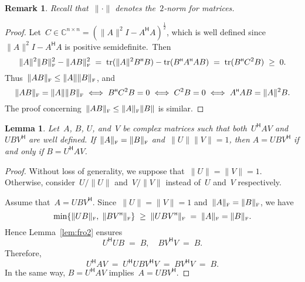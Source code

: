 \documentclass[11pt,a4paper]{article}  %
\numberwithin{equation}{section}
\newtheorem{lemma}{Lemma}%
\newtheorem{remark}{Remark}%
\theoremstyle{definition}
\def\CC{\mathbb{C}}
\DeclareMathOperator{\tr}{tr}
\newcommand{\fro}{{\scriptscriptstyle{\textnormal{F}}}}
\newcommand{\hmt}{{\scriptscriptstyle{{\mathsf{H}}}}}
\begin{document}
\begin{remark}
  Recall that~$\|\cdot\|$ denotes the~$2$-norm for matrices.
\end{remark}

\begin{proof}
  Let~$C\in\CC^{n\times n}=(\|A\|^2 I - A^\hmt A)^\frac{1}{2}$, which is well defined since~$\|A\|^2
  I - A^\hmt A$ is positive semidefinite.~Then%
  \begin{equation*}
  \|A\|^2\|B\|_\fro^2 - \|AB\|_\fro^2 \;=\; \tr(\|A\|^2 B^\hmt B) - \tr(B^\hmt A^\hmt A B)\;=\; \tr(B^\hmt C^2 B)\;\ge\; 0.
  \end{equation*}
  Thus~$\|AB\|_\fro \le \|A\|\|B\|_\fro$, and
  \begin{equation*}
    \|AB\|_\fro = \|A\|\|B\|_\fro
    \;\Longleftrightarrow \; B^\hmt C^2 B =0
    \;\Longleftrightarrow \; C^2 B =0
    \;\Longleftrightarrow \; A^\hmt A B = \|A\|^2 B.
  \end{equation*}
  The proof concerning~$\|AB\|_\fro \le \|A\|_\fro\|B\|$ is similar.
\end{proof}

\begin{lemma}
  \label{lem:uav}
  Let~$A$, $B$, $U$, and~$V$ be complex matrices such that both~$U^\hmt AV$
  and~$UBV^\hmt$ are well defined.
  If~$\|A\|_\fro=\|B\|_\fro$ and~$\|U\|\|V\|=1$, then $A = UBV^\hmt$ if and only if
  $B = U^\hmt A V$.
\end{lemma}

\begin{proof}
  Without loss of generality, we suppose that~$\|U\|=\|V\|=1$. Otherwise, consider~$U/\|U\|$
  and~$V/\|V\|$ instead of~$U$ and~$V$ respectively.

  Assume that~$A = UBV^\hmt$. Since~$\|U\|=\|V\|=1$ and~$\|A\|_\fro=\|B\|_\fro$, we have
 \begin{equation*}
   \min\{\|UB\|_\fro,\; \|BV^\hmt\|_\fro\}\;\ge\;\|UBV^\hmt\|_\fro\;=\;\|A\|_\fro = \|B\|_\fro.
 \end{equation*}
 Hence Lemma~\ref{lem:fro2} ensures
 \begin{equation*}
   U^\hmt U B \;=\; B, \quad BV^\hmt V \;=\; B.
 \end{equation*}
 Therefore,
 \begin{equation*}
   U^\hmt A V \;=\; U^\hmt U B V^\hmt V \;=\; B V^\hmt V \;=\; B.
 \end{equation*}
 In the same way, $B=U^\hmt A V$ implies~$A = UBV^\hmt$.
\end{proof}
\end{document}
